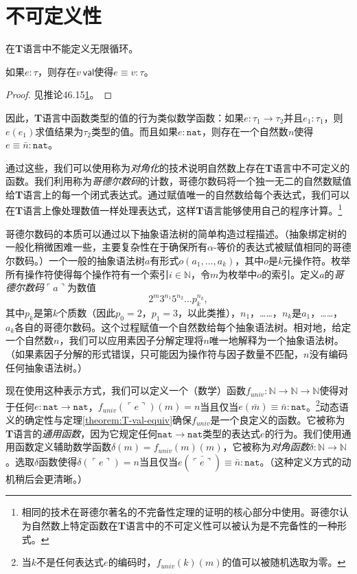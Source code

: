 \section{不可定义性}

在\textbf{T}语言中不能定义无限循环。

\begin{theorem}\label{theorem:T-val-equiv}
如果$e:\tau$，则存在$v\ \mathsf{val}$使得$e\equiv v:\tau$。
\end{theorem}

\begin{proof}
见推论46.15\ref{}。
\end{proof}

因此，\textbf{T}语言中函数类型的值的行为类似数学函数：如果$e:\tau_1\to\tau_2$并且$e_1:\tau_1$，则$e(e_1)$求值结果为$\tau_2$类型的值。而且如果$e:\mathtt{nat}$，则存在一个自然数$n$使得$e\equiv\bar{n}:\mathtt{nat}$。

通过这些，我们可以使用称为\textit{对角化}的技术说明自然数上存在\textbf{T}语言中不可定义的函数。我们利用称为\textit{哥德尔数码}的计数，哥德尔数码将一个独一无二的自然数赋值给\textbf{T}语言上的每一个闭式表达式。通过赋值唯一的自然数给每个表达式，我们可以在\textbf{T}语言上像处理数值一样处理表达式，这样\textbf{T}语言能够使用自己的程序计算。\footnote{相同的技术在哥德尔著名的不完备性定理的证明的核心部分中使用。哥德尔认为自然数上特定函数在\textbf{T}语言中的不可定义性可以被认为是不完备性的一种形式。}

哥德尔数码的本质可以通过以下抽象语法树的简单构造过程描述。（抽象绑定树的一般化稍微困难一些，主要复杂性在于确保所有$\alpha$-等价的表达式被赋值相同的哥德尔数码。）一个一般的抽象语法树$a$有形式$o(a_1,...,a_k)$，其中$o$是$k$元操作符。枚举所有操作符使得每个操作符有一个索引$i\in\mathbb{N}$，令$m$为枚举中$o$的索引。定义$a$的\textit{哥德尔数码}$\ulcorner a\urcorner$为数值
\begin{equation*}
2^{m}3^{n_1}5^{n_2}...p_{k}^{n_k},
\end{equation*}
其中$p_k$是第$k$个质数（因此$p_0=2$，$p_1=3$，以此类推），$n_1$，……，$n_k$是$a_1$，……，$a_k$各自的哥德尔数码。这个过程赋值一个自然数给每个抽象语法树。相对地，给定一个自然数$n$，我们可以应用素因子分解定理将$n$唯一地解释为一个抽象语法树。（如果素因子分解的形式错误，只可能因为操作符与因子数量不匹配，$n$没有编码任何抽象语法树。）

现在使用这种表示方式，我们可以定义一个（数学）函数$f_{univ}:\mathbb{N}\to\mathbb{N}\to\mathbb{N}$使得对于任何$e:\mathtt{nat}\to\mathtt{nat}$，$f_{univ}(\ulcorner e\urcorner)(m)=n$当且仅当$e(\bar{m})\equiv\bar{n}:\mathtt{nat}$。\footnote{当$k$不是任何表达式$e$的编码时，$f_{univ}(k)(m)$的值可以被随机选取为零。}动态语义的确定性与定理\ref{theorem:T-val-equiv}确保$f_{univ}$是一个良定义的函数。它被称为\textbf{T}语言的\textit{通用函数}，因为它规定任何$\mathtt{nat}\to\mathtt{nat}$类型的表达式$e$的行为。我们使用通用函数定义辅助数学函数$\delta(m)=f_{univ}(m)(m)$，它被称为\textit{对角函数}$\delta:\mathbb{N}\to\mathbb{N}$。选取$\delta$函数使得$\delta(\ulcorner e\urcorner)=n$当且仅当$e(\bar{\ulcorner e\urcorner})\equiv\bar{n}:\mathtt{nat}$。（这种定义方式的动机稍后会更清晰。）

